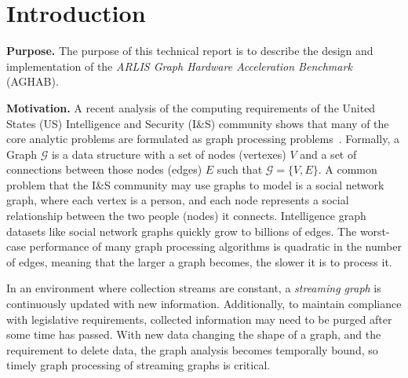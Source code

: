 \section{Introduction}\label{section:introduction}

\par{
    \textbf{Purpose.} The purpose of this technical report is to describe the design and implementation of the \textit{ARLIS Graph Hardware Acceleration Benchmark} (AGHAB).
}

\par{
    \textbf{Motivation.} A recent analysis of the computing requirements of the United States (US) Intelligence and Security (I\&S) community shows that many of the core analytic problems are formulated as graph processing problems~\cite{Regli2022a}.
    Formally, a Graph $\mathcal{G}$ is a data structure with a set of nodes (vertexes) $V$ and a set of connections between those nodes (edges) $E$ such that $\mathcal{G} = \{V, E\}$.
    A common problem that the I\&S community may use graphs to model is a social network graph, where each vertex is a person, and each node represents a social relationship between the two people (nodes) it connects.
    Intelligence graph datasets like social network graphs quickly grow to billions of edges. 
    The worst-case performance of many graph processing algorithms is quadratic in the number of edges, meaning that the larger a graph becomes, the slower it is to process it.} 

\par{
    In an environment where collection streams are constant, a \textit{streaming graph} is continuously updated with new information.
    Additionally, to maintain compliance with legislative requirements, collected information may need to be purged after some time has passed.
    With new data changing the shape of a graph, and the requirement to delete data, the graph analysis becomes temporally bound, so timely graph processing of streaming graphs is critical.} 

